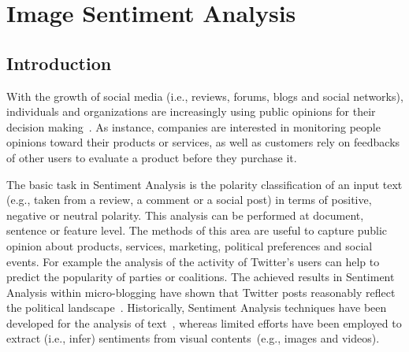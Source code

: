 \chapter{Image Sentiment Analysis}\label{ch3}
\section{Introduction}


With the growth of social media (i.e., reviews, forums, blogs and social networks), individuals and organizations are increasingly using public opinions  for their decision making~\cite{liu2012survey}.
As instance, companies are interested in monitoring people opinions toward their products or services, as well as customers rely on feedbacks of other users to evaluate a product before they purchase it.

The basic task in Sentiment Analysis is the polarity classification of an input text (e.g., taken from a review, a comment or a social post) in terms of positive, negative or neutral polarity. This analysis can be performed at document, sentence or feature level. The methods of this area are useful to capture public opinion about products, services, marketing, political preferences and social events. For example the analysis of the activity of Twitter's users can help to predict the popularity of parties or coalitions. The achieved results in Sentiment Analysis within micro-blogging have shown that Twitter posts reasonably reflect the political landscape~\cite{tumasjan2010predicting}.
Historically, Sentiment Analysis techniques have been developed for the analysis of text~\cite{pang2008opinion}, whereas limited efforts have been employed to extract (i.e., infer) sentiments from visual contents~(e.g., images and videos). %

